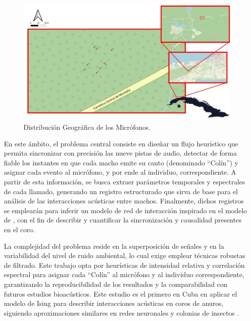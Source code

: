\begin{figure}[h!]
    \centering
    \includegraphics[width=\columnwidth]{Graphics/mic_map.jpg}
    \caption{Distribución Geográfica de los Micrófonos.}
    \label{fig:map}
\end{figure}

En este ámbito, el problema central consiste en diseñar un flujo 
heurístico que permita sincronizar con precisión las 
nueve pistas de audio, detectar de forma fiable los instantes en 
que cada macho emite su canto (denominado “Colín”) y asignar 
cada evento al micrófono, y por ende al individuo, 
correspondiente. A partir de esta información, se busca extraer 
parámetros temporales y espectrales de cada llamado, generando 
un registro estructurado que sirva de base para el análisis de 
las interacciones acústicas entre machos. Finalmente, dichos 
registros se emplearán para inferir un modelo de red de 
interacción inspirado en el modelo de  \cite{ising1925beitrag}, con el fin de 
describir y cuantificar la sincronización y causalidad presentes 
en el coro.

La complejidad del problema reside en la superposición de 
señales y en la variabilidad del nivel de ruido ambiental, lo 
cual exige emplear técnicas robustas de filtrado. 
Este trabajo opta por heurísticas 
de intensidad relativa y correlación espectral para asignar cada “Colín” al micrófono y 
al individuo correspondiente, garantizando 
la reproducibilidad de los resultados y la comparabilidad con 
futuros estudios bioacústicos. Este estudio es el primero en 
Cuba en aplicar el modelo de Ising para describir 
interacciones acústicas en coros de anuros, siguiendo 
aproximaciones similares en redes 
neuronales y colonias de insectos \cite{schneidman2006weak,mora2011biological,bialek2012biophysics,reyes2019transmission}.

